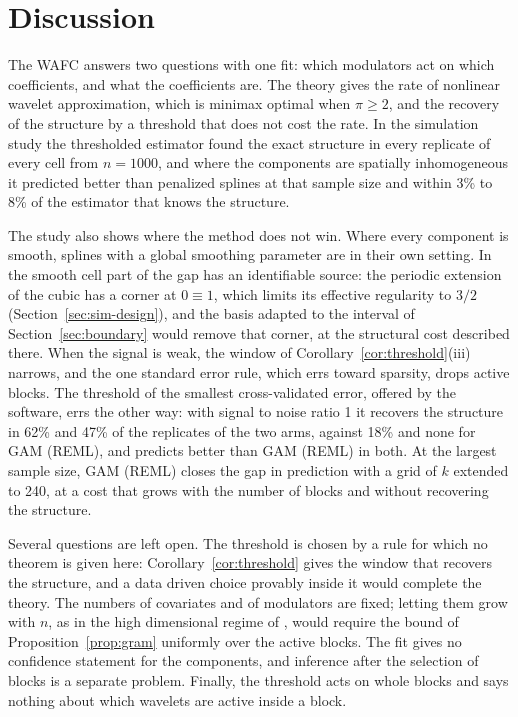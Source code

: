 \documentclass[12pt]{article} %
\theoremstyle{definition}
\theoremstyle{plain}
\begin{document}
{\color{colR1}
\section{Discussion}
\label{sec:discussion}

The WAFC answers two questions with one fit: which modulators act on which
coefficients, and what the coefficients are. The theory gives the rate of
nonlinear wavelet approximation, which is minimax optimal when $\pi \ge 2$,
and the recovery of the structure by a threshold that does not cost the rate.
In the simulation study the thresholded estimator found the exact structure in
every replicate of every cell from $n = 1000$, and where the components are
spatially inhomogeneous it predicted better than penalized splines at that
sample size and within 3\% to 8\% of the estimator that knows the structure.

The study also shows where the method does not win. Where every component is
smooth, splines with a global smoothing parameter are in their own setting.
In the smooth cell part of the gap has an identifiable source: the periodic
extension of the cubic has a corner at $0 \equiv 1$, which limits its
effective regularity to $3/2$ (Section~\ref{sec:sim-design}), and the basis
adapted to the interval of Section~\ref{sec:boundary} would remove that
corner, at the structural cost described there. When the signal is weak, the
window of Corollary~\ref{cor:threshold}(iii) narrows, and the one standard
error rule, which errs toward sparsity, drops active blocks. The threshold of
the smallest cross-validated error, offered by the software, errs the other
way: with signal to noise ratio 1 it recovers the structure in 62\% and 47\%
of the replicates of the two arms, against 18\% and none for GAM (REML), and
predicts better than GAM (REML) in both. At the largest sample size, GAM
(REML) closes the gap in prediction with a grid of $k$ extended to 240, at a
cost that grows with the number of blocks and without recovering the
structure.

Several questions are left open. The threshold is chosen by a rule for which
no theorem is given here: Corollary~\ref{cor:threshold} gives the window that
recovers the structure, and a data driven choice provably inside it would
complete the theory. The numbers of covariates and of modulators are fixed;
letting them grow with $n$, as in the high dimensional regime of
\citet{Klopp-Pensky-2015}, would require the bound of
Proposition~\ref{prop:gram} uniformly over the active blocks. The fit gives
no confidence statement for the components, and inference after the
selection of blocks is a separate problem. Finally, the threshold acts on
whole blocks and says nothing about which wavelets are active inside a block.
}
\end{document}
